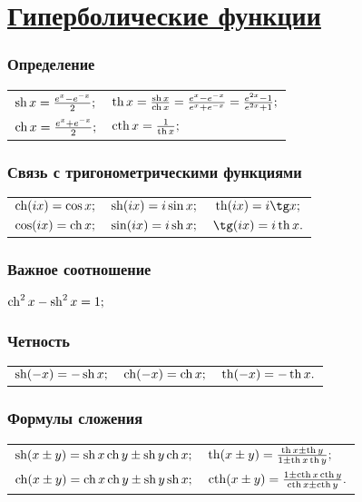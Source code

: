 \section[Гиперболические функции]{\protect\href{https://ru.wikipedia.org/wiki/\%D0\%93\%D0\%B8\%D0\%BF\%D0\%B5\%D1\%80\%D0\%B1\%D0\%BE\%D0\%BB\%D0\%B8\%D1\%87\%D0\%B5\%D1\%81\%D0\%BA\%D0\%B8\%D0\%B5_\%D1\%84\%D1\%83\%D0\%BD\%D0\%BA\%D1\%86\%D0\%B8\%D0\%B8}{Гиперболические функции}}

\subsubsection{Определение}
\begin{tabular}{l l}
$\sh x = \frac{e^{x}-e^{-x}}{2};$
&
$\th x = \frac{\sh x}{\ch x}=\frac{e^{x}-e^{-x}}{e^{x}+e^{-x}}=\frac{e^{2x}-1}{e^{2x}+1};$
\\
$\ch x = \frac{e^{x}+e^{-x}}{2};$
&
$\cth x = \frac{1}{\th x};$
\end{tabular}

\subsubsection{Связь с тригонометрическими функциями}
\begin{tabular}{c c c}
$\ch (ix) = \cos x;$
&
$\sh (ix)= i \sin x;$
&
$\th (ix) = i \tg x;$
\\
$\cos (ix) = \ch x;$
&
$\sin (ix) = i \sh x;$
&
$\tg (ix) = i \th x.$
\end{tabular}

\subsubsection{Важное соотношение}
$\ch^2 x - \sh^2 x = 1;$

\subsubsection{Четность}
\begin{tabular}{l l l}
$\sh (-x) = -\sh x;$
&
$\ch (-x) = \ch x;$
&
$\th (-x) = -\th x.$
\end{tabular}

\subsubsection{Формулы сложения}
\begin{tabular}{l l}
$\sh (x\pm y) =  \sh x \ch y \pm \sh y \ch x;$
&
$\th (x \pm y) = \frac{\th x \pm \th y}{1 \pm \th x \th y};$
\\
$\ch (x\pm y) =  \ch x \ch y \pm \sh y \sh x;$
&
$\cth (x \pm y) = \frac{1 \pm \cth x \cth y}{\cth x \pm \cth y}.$
\end{tabular}

